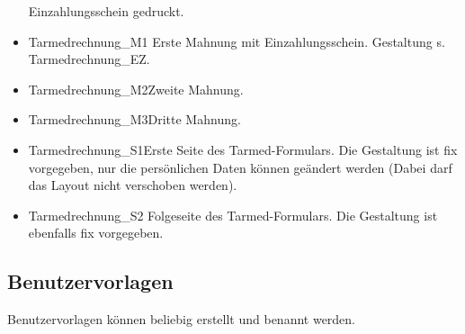 \begin{itemize}
  Einzahlungsschein gedruckt.
  \item {Tarmedrechnung\_M1} Erste Mahnung mit Einzahlungsschein. Gestaltung s. Tarmedrechnung\_EZ.
  \item {Tarmedrechnung\_M2}Zweite Mahnung.
  \item {Tarmedrechnung\_M3}Dritte Mahnung.
  \item {Tarmedrechnung\_S1}Erste Seite des Tarmed-Formulars. Die Gestaltung ist
  fix vorgegeben, nur die persönlichen Daten können geändert werden (Dabei darf
  das Layout nicht verschoben werden).
  \item {Tarmedrechnung\_S2} Folgeseite des Tarmed-Formulars. Die Gestaltung ist
  ebenfalls fix vorgegeben.
\end{itemize}


\subsection{Benutzervorlagen}
Benutzervorlagen können beliebig erstellt und benannt werden.
